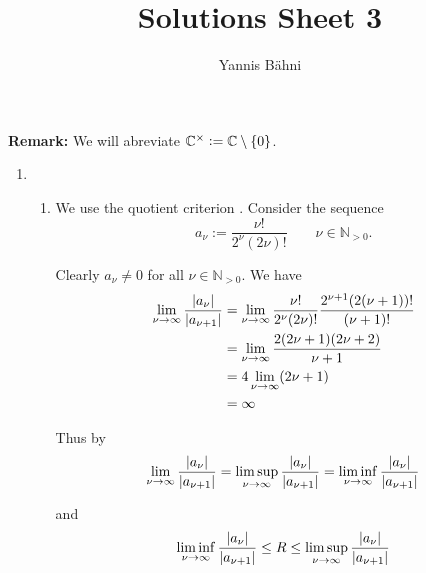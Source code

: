

\title{Solutions Sheet 3}
\author{Yannis B\"{a}hni}
\address[Yannis B\"{a}hni]{University of Zurich, R\"{a}mistrasse 71, 8006 Zurich}


\maketitle
\thispagestyle{fancy}
\textbf{Remark:} We will abreviate $\mathbb{C}^\times := \mathbb{C} \setminus \cbr[0]{0}$.
\begin{enumerate}[label = \textbf{Exercise \arabic*.},wide = 0pt, itemsep=1.5ex]
	\item
		~
		\begin{enumerate}[label = (\alph*),wide = 0pt, itemsep=1.5ex]
			\item We use the quotient criterion \cite[100]{remmert2002funktionentheorie}. Consider the sequence
				\begin{equation}
					a_\nu := \frac{\nu!}{2^\nu (2\nu)!} \qquad \nu \in \mathbb{N}_{> 0}.
				\end{equation}

				Clearly $a_\nu \neq 0$ for all $\nu \in \mathbb{N}_{>0}$. We have 
				\begin{align*}
					\lim_{\nu \to \infty} \frac{\abs[0]{a_\nu}}{\abs[0]{a_{\nu + 1}}} &= \lim_{\nu \to \infty} \frac{\nu!}{2^\nu(2\nu)!}\frac{2^{\nu + 1}(2(\nu + 1))!}{(\nu + 1)!}\\
					&= \lim_{\nu \to \infty} \frac{2(2\nu + 1)(2\nu + 2)}{\nu + 1}\\
					&= 4\lim_{\nu \to \infty}(2\nu + 1)\\
					&= \infty
				\end{align*}

				Thus by
				\begin{equation}
					\lim_{\nu \to \infty} \frac{\abs[0]{a_\nu}}{\abs[0]{a_{\nu + 1}}} = \limsup_{\nu \to \infty} \frac{\abs[0]{a_\nu}}{\abs[0]{a_{\nu + 1}}} = \liminf_{\nu \to \infty} \frac{\abs[0]{a_\nu}}{\abs[0]{a_{\nu + 1}}}
				\end{equation}

				\noindent and 
				\begin{equation}
					 \liminf_{\nu \to \infty} \frac{\abs[0]{a_\nu}}{\abs[0]{a_{\nu + 1}}} \leq R \leq \limsup_{\nu \to \infty} \frac{\abs[0]{a_\nu}}{\abs[0]{a_{\nu + 1}}}
				\end{equation}


\end{enumerate}
\end{enumerate}
